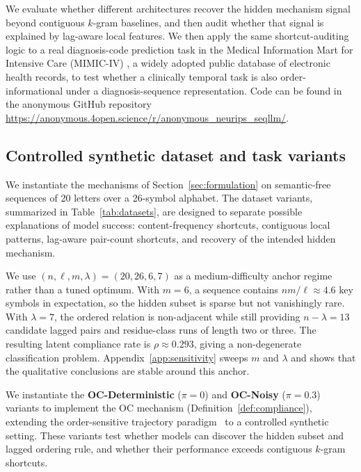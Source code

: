 \documentclass{article}
\theoremstyle{plain}
\theoremstyle{definition}
\theoremstyle{remark}
\begin{document}
We evaluate whether different architectures recover the hidden mechanism signal beyond contiguous $k$-gram baselines, and then audit whether that signal is explained by lag-aware local features. We then apply the same shortcut-auditing logic to a real diagnosis-code prediction task in the Medical Information Mart for Intensive Care (MIMIC-IV) \citep{johnson2023mimiciv}, a widely adopted public database of electronic health records, to test whether a clinically temporal task is also order-informational under a diagnosis-sequence representation. Code can be found in the anonymous GitHub repository \href{https://anonymous.4open.science/r/anonymous_neurips_seqllm/}{https://anonymous.4open.science/r/anonymous\_neurips\_seqllm/}. 

\subsection{Controlled synthetic dataset and task variants}
\label{sec:task_variants}

We instantiate the mechanisms of Section~\ref{sec:formulation} on semantic-free sequences of 20 letters over a 26-symbol alphabet. The dataset variants, summarized in Table~\ref{tab:datasets}, are designed to separate possible explanations of model success: content-frequency shortcuts, contiguous local patterns, lag-aware pair-count shortcuts, and recovery of the intended hidden mechanism.

We use $(n,\ell,m,\lambda)=(20,26,6,7)$ as a medium-difficulty anchor regime rather than a tuned optimum. With $m=6$, a sequence contains $nm/\ell \approx 4.6$ key symbols in expectation, so the hidden subset is sparse but not vanishingly rare. With $\lambda=7$, the ordered relation is non-adjacent while still providing $n-\lambda=13$ candidate lagged pairs and residue-class runs of length two or three. The resulting latent compliance rate is $\rho \approx 0.293$, giving a non-degenerate classification problem. Appendix~\ref{app:sensitivity} sweeps $m$ and $\lambda$ and shows that the qualitative conclusions are stable around this anchor.

We instantiate the \textbf{OC-Deterministic} ($\pi=0$) and \textbf{OC-Noisy} ($\pi=0.3$) variants to implement the OC mechanism (Definition~\ref{def:compliance}), extending the order-sensitive trajectory paradigm~\citep{edelman2026order_specific_ehr,placido2023pancreatic_trajectories} to a controlled synthetic setting. These variants test whether models can discover the hidden subset and lagged ordering rule, and whether their performance exceeds contiguous $k$-gram shortcuts.
\end{document}
